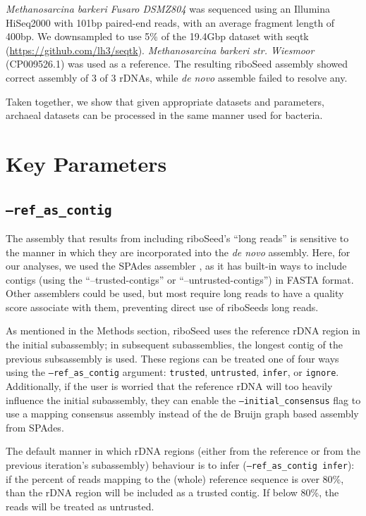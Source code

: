 \documentclass[10pt]{article}
\begin{document}
\textit{Methanosarcina barkeri Fusaro DSMZ804} was sequenced using an Illumina HiSeq2000 with 101bp paired-end reads, with an average fragment length of 400bp. We downsampled to use 5\% of the 19.4Gbp dataset with seqtk (\href{https://github.com/lh3/seqtk}{https://github.com/lh3/seqtk}). \textit{Methanosarcina barkeri str. Wiesmoor} (CP009526.1) was used as a reference. The resulting riboSeed assembly showed correct assembly of 3 of 3 rDNAs, while \textit{de novo} assemble failed to resolve any.

Taken together, we show that given appropriate datasets and parameters, archaeal datasets can be processed in the same manner used for bacteria.


\section*{Key Parameters}
\subsection*{\texttt{--ref\_as\_contig}}
The assembly that results from including riboSeed's ``long reads'' is sensitive to the manner in which they are incorporated into the \textit{de novo} assembly. Here, for our analyses, we used the SPAdes assembler \cite{Bankevich2012}, as it has built-in ways to include contigs (using the ``--trusted-contigs'' or ``--untrusted-contigs'') in FASTA format.  Other assemblers could be used, but most require long reads to have a quality score associate with them, preventing direct use of riboSeeds long reads.

As mentioned in the Methods section, riboSeed uses the reference rDNA region in the initial subassembly;  in subsequent subassemblies, the longest contig of the previous subsassembly is used.  These regions can be treated one of four ways using the \texttt{--ref\_as\_contig} argument: \texttt{trusted}, \texttt{untrusted}, \texttt{infer}, or \texttt{ignore}.  Additionally, if the user is worried that the reference rDNA will too heavily influence the initial subassembly, they can enable the \texttt{--initial\_consensus} flag to use a mapping consensus assembly instead of the de Bruijn graph based assembly from SPAdes.

The default manner in which rDNA regions (either from the reference or from the previous iteration's subassembly) behaviour is to infer (\texttt{--ref\_as\_contig infer}): if the percent of reads mapping to  the (whole) reference sequence  is over 80\%, than the rDNA region will be included as a trusted contig.  If below 80\%, the reads will be treated as untrusted.
\end{document}
